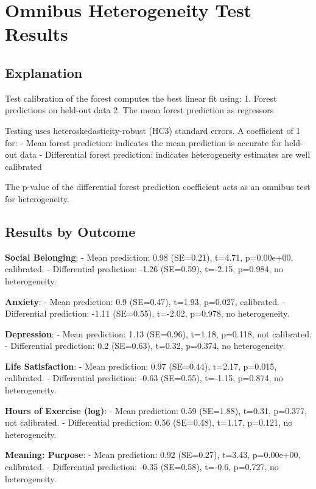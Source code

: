 \documentclass[
  single column]{article}
\begin{document}
\section{Omnibus Heterogeneity Test
Results}\label{omnibus-heterogeneity-test-results}

\subsection{Explanation}\label{explanation}

Test calibration of the forest computes the best linear fit using: 1.
Forest predictions on held-out data 2. The mean forest prediction as
regressors

Testing uses heteroskedasticity-robust (HC3) standard errors. A
coefficient of 1 for: - Mean forest prediction: indicates the mean
prediction is accurate for held-out data - Differential forest
prediction: indicates heterogeneity estimates are well calibrated

The p-value of the differential forest prediction coefficient acts as an
omnibus test for heterogeneity.

\subsection{Results by Outcome}\label{results-by-outcome}

\textbf{Social Belonging}: - Mean prediction: 0.98 (SE=0.21), t=4.71,
p=0.00e+00, calibrated. - Differential prediction: -1.26 (SE=0.59),
t=-2.15, p=0.984, no heterogeneity.

\textbf{Anxiety}: - Mean prediction: 0.9 (SE=0.47), t=1.93, p=0.027,
calibrated. - Differential prediction: -1.11 (SE=0.55), t=-2.02,
p=0.978, no heterogeneity.

\textbf{Depression}: - Mean prediction: 1.13 (SE=0.96), t=1.18, p=0.118,
not calibrated. - Differential prediction: 0.2 (SE=0.63), t=0.32,
p=0.374, no heterogeneity.

\textbf{Life Satisfaction}: - Mean prediction: 0.97 (SE=0.44), t=2.17,
p=0.015, calibrated. - Differential prediction: -0.63 (SE=0.55),
t=-1.15, p=0.874, no heterogeneity.

\textbf{Hours of Exercise (log)}: - Mean prediction: 0.59 (SE=1.88),
t=0.31, p=0.377, not calibrated. - Differential prediction: 0.56
(SE=0.48), t=1.17, p=0.121, no heterogeneity.

\textbf{Meaning: Purpose}: - Mean prediction: 0.92 (SE=0.27), t=3.43,
p=0.00e+00, calibrated. - Differential prediction: -0.35 (SE=0.58),
t=-0.6, p=0.727, no heterogeneity.
\end{document}
